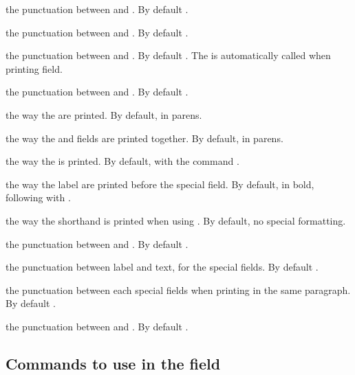 \documentclass{ltxdockit}[2011/03/25]
\begin{document}
\begin{ltxsyntax}
 the punctuation between  and . By default .

 the punctuation between  and . By default .

 the punctuation between  and . By default . The  is automatically called when printing  field. 

 the punctuation between  and . By default .

 the way the  are printed. By default, in parens.

 the way the  and  fields are printed together. By default, in parens.

 the way the  is printed. By default, with the command .

 the way the label are printed before the special field. By default, in bold, following with .

 the way the shorthand is printed when using . By default, no special formatting.

 the punctuation between  and .  By default .

 the punctuation between label and text, for the special fields. By default .

 the punctuation between each special fields when printing in the same paragraph. By default .

 the punctuation between  and . By default .
\end{ltxsyntax}

\subsection{Commands to use in the  field}
\end{document}
